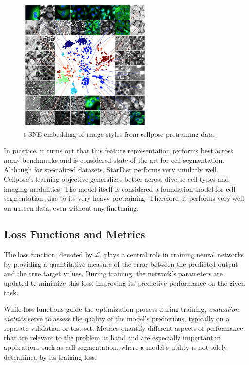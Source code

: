 \begin{figure}[!ht]
    \centering
    \includegraphics[width=0.6\textwidth]{Images/SOTA/tSNE_cellpose.png}
    \caption{t-SNE embedding of image styles from cellpose pretraining data.}
    \label{fig:t-SNE}
\end{figure}


In practice, it turns out that this feature representation performs best across many benchmarks and is considered state-of-the-art for cell segmentation. Although for specialized datasets, StarDist performs very similarly well, Cellpose's learning objective generalizes better across diverse cell types and imaging modalities. The model itself is considered a foundation model for cell segmentation, due to its very heavy pretraining. Therefore, it performs very well on unseen data, even without any finetuning. 


\subsection{Loss Functions and Metrics}

The loss function, denoted by $\mathcal{L}$, plays a central role in training neural networks by providing a quantitative measure of the error between the predicted output and the true target values. During training, the network's parameters are updated to minimize this loss, improving its predictive performance on the given task.

While loss functions guide the optimization process during training, \textit{evaluation metrics} serve to assess the quality of the model's predictions, typically on a separate validation or test set. Metrics quantify different aspects of performance that are relevant to the problem at hand and are especially important in applications such as cell segmentation, where a model's utility is not solely determined by its training loss.

